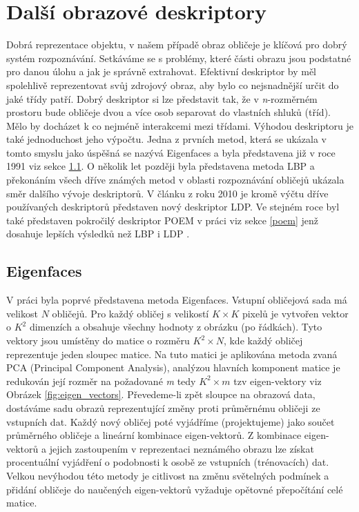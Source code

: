\documentclass[czech,BP]{thesiskiv}
\begin{document}
\section{Další obrazové deskriptory}
Dobrá reprezentace objektu, v našem případě obraz obličeje je klíčová pro dobrý systém rozpoznávání. Setkáváme se s problémy, které části obrazu jsou podstatné pro danou úlohu a jak je správně extrahovat. Efektivní deskriptor by měl spolehlivě reprezentovat svůj zdrojový obraz, aby bylo co nejsnadnější určit do jaké třídy patří. Dobrý deskriptor si lze představit tak, že v \textit{n}-rozměrném prostoru bude obličeje dvou a více osob separovat do vlastních shluků (tříd). Mělo by docházet k co nejméně interakcemi mezi třídami. Výhodou deskriptoru je také jednoduchost jeho výpočtu. Jedna z prvních metod, která se ukázala v tomto smyslu jako úspěšná se nazývá Eigenfaces a byla představena již v roce 1991 viz sekce \ref{eigenface}. O několik let později byla představena metoda LBP a překonáním všech dříve známých metod v oblasti rozpoznávání obličejů ukázala směr dalšího vývoje deskriptorů. V článku \citet{Zhang2010} z roku 2010 je kromě výčtu dříve používaných deskriptorů představen nový deskriptor LDP. Ve stejném roce byl také představen pokročilý deskriptor POEM v práci \citet{Alice2010} viz sekce \ref{poem} jenž dosahuje lepších výsledků než LBP i LDP \cite{Vojta2015}.

\subsection{Eigenfaces} \label{eigenface}
V práci \citet{Turk1991} byla poprvé představena metoda Eigenfaces. Vstupní obličejová sada má velikost $N$ obličejů. Pro každý obličej s velikostí $K\times K$ pixelů je vytvořen vektor o $K^2$ dimenzích a obsahuje všechny hodnoty z obrázku (po řádkách). Tyto vektory jsou umístěny do matice o rozměru $K^2\times N$, kde každý obličej reprezentuje jeden sloupec matice. Na tuto matici je aplikována metoda zvaná PCA (Principal Component Analysis), analýzou hlavních komponent matice je redukován její rozměr na požadované \textit{m} tedy $K^2\times m$ tzv eigen-vektory viz Obrázek \ref{fig:eigen_vectors}. Převedeme-li zpět sloupce na obrazová data, dostáváme sadu obrazů reprezentující změny proti průměrnému obličeji ze vstupních dat. Každý nový obličej poté vyjádříme (projektujeme) jako součet průměrného obličeje a lineární kombinace eigen-vektorů. Z kombinace eigen-vektorů a jejich zastoupením v reprezentaci neznámého obrazu lze získat procentuální vyjádření o podobnosti k osobě ze vstupních (trénovacích) dat. Velkou nevýhodou této metody je citlivost na změnu světelných podmínek a přidání obličeje do naučených eigen-vektorů vyžaduje opětovné přepočítání celé matice.
\end{document}
